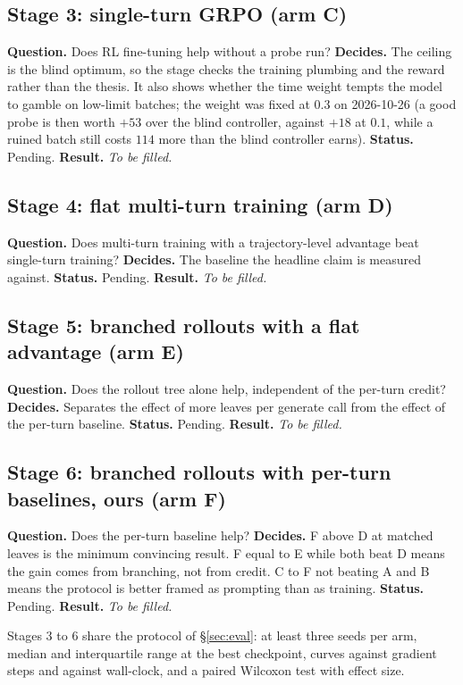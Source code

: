 \documentclass[11pt,a4paper]{article}
\begin{document}
\subsection{Stage 3: single-turn GRPO (arm C)}
\textbf{Question.} Does RL fine-tuning help without a probe run?
\textbf{Decides.} The ceiling is the blind optimum, so the stage checks the training plumbing and the reward rather than the thesis. It also shows whether the time weight tempts the model to gamble on low-limit batches; the weight was fixed at $0.3$ on 2026-10-26 (a good probe is then worth $+53$ over the blind controller, against $+18$ at $0.1$, while a ruined batch still costs $114$ more than the blind controller earns).
\textbf{Status.} Pending. \textbf{Result.} \emph{To be filled.}

\subsection{Stage 4: flat multi-turn training (arm D)}
\textbf{Question.} Does multi-turn training with a trajectory-level advantage beat single-turn training?
\textbf{Decides.} The baseline the headline claim is measured against.
\textbf{Status.} Pending. \textbf{Result.} \emph{To be filled.}

\subsection{Stage 5: branched rollouts with a flat advantage (arm E)}
\textbf{Question.} Does the rollout tree alone help, independent of the per-turn credit?
\textbf{Decides.} Separates the effect of more leaves per generate call from the effect of the per-turn baseline.
\textbf{Status.} Pending. \textbf{Result.} \emph{To be filled.}

\subsection{Stage 6: branched rollouts with per-turn baselines, ours (arm F)}
\textbf{Question.} Does the per-turn baseline help?
\textbf{Decides.} F above D at matched leaves is the minimum convincing result. F equal to E while both beat D means the gain comes from branching, not from credit. C to F not beating A and B means the protocol is better framed as prompting than as training.
\textbf{Status.} Pending. \textbf{Result.} \emph{To be filled.}

Stages 3 to 6 share the protocol of \S\ref{sec:eval}: at least three seeds per arm, median and interquartile range at the best checkpoint, curves against gradient steps and against wall-clock, and a paired Wilcoxon test with effect size.
\end{document}
